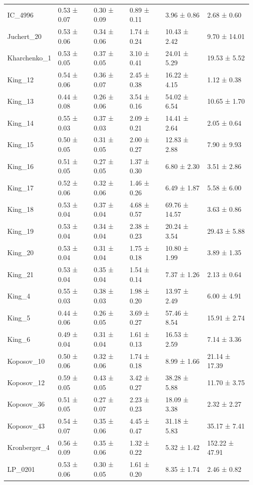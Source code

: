 \begin{tabular}{llllll}
IC_4996 & 0.53 ± 0.07 & 0.30 ± 0.09 & 0.89 ± 0.11 & 3.96 ± 0.86 & 2.68 ± 0.60 \\
Juchert_20 & 0.53 ± 0.06 & 0.34 ± 0.06 & 1.74 ± 0.24 & 10.43 ± 2.42 & 9.70 ± 14.01 \\
Kharchenko_1 & 0.53 ± 0.05 & 0.37 ± 0.05 & 3.10 ± 0.41 & 24.01 ± 5.29 & 19.53 ± 5.52 \\
King_12 & 0.54 ± 0.06 & 0.36 ± 0.07 & 2.45 ± 0.38 & 16.22 ± 4.15 & 1.12 ± 0.38 \\
King_13 & 0.44 ± 0.08 & 0.26 ± 0.06 & 3.54 ± 0.16 & 54.02 ± 6.54 & 10.65 ± 1.70 \\
King_14 & 0.55 ± 0.03 & 0.37 ± 0.03 & 2.09 ± 0.21 & 14.41 ± 2.64 & 2.05 ± 0.64 \\
King_15 & 0.50 ± 0.05 & 0.31 ± 0.05 & 2.00 ± 0.27 & 12.83 ± 2.88 & 7.90 ± 9.93 \\
King_16 & 0.51 ± 0.05 & 0.27 ± 0.05 & 1.37 ± 0.30 & 6.80 ± 2.30 & 3.51 ± 2.86 \\
King_17 & 0.52 ± 0.06 & 0.32 ± 0.06 & 1.46 ± 0.26 & 6.49 ± 1.87 & 5.58 ± 6.00 \\
King_18 & 0.53 ± 0.04 & 0.37 ± 0.04 & 4.68 ± 0.57 & 69.76 ± 14.57 & 3.63 ± 0.86 \\
King_19 & 0.53 ± 0.04 & 0.34 ± 0.04 & 2.38 ± 0.23 & 20.24 ± 3.54 & 29.43 ± 5.88 \\
King_20 & 0.53 ± 0.04 & 0.31 ± 0.04 & 1.75 ± 0.18 & 10.80 ± 1.99 & 3.89 ± 1.35 \\
King_21 & 0.53 ± 0.04 & 0.35 ± 0.04 & 1.54 ± 0.14 & 7.37 ± 1.26 & 2.13 ± 0.64 \\
King_4 & 0.55 ± 0.03 & 0.38 ± 0.03 & 1.98 ± 0.20 & 13.97 ± 2.49 & 6.00 ± 4.91 \\
King_5 & 0.44 ± 0.06 & 0.26 ± 0.05 & 3.69 ± 0.27 & 57.46 ± 8.54 & 15.91 ± 2.74 \\
King_6 & 0.49 ± 0.04 & 0.31 ± 0.04 & 1.61 ± 0.13 & 16.53 ± 2.59 & 7.14 ± 3.36 \\
Koposov_10 & 0.50 ± 0.06 & 0.32 ± 0.06 & 1.74 ± 0.18 & 8.99 ± 1.66 & 21.14 ± 17.39 \\
Koposov_12 & 0.59 ± 0.05 & 0.43 ± 0.05 & 3.42 ± 0.27 & 38.28 ± 5.88 & 11.70 ± 3.75 \\
Koposov_36 & 0.51 ± 0.05 & 0.27 ± 0.07 & 2.23 ± 0.23 & 18.09 ± 3.38 & 2.32 ± 2.27 \\
Koposov_43 & 0.54 ± 0.07 & 0.35 ± 0.06 & 4.45 ± 0.47 & 31.18 ± 5.83 & 35.17 ± 7.41 \\
Kronberger_4 & 0.56 ± 0.09 & 0.35 ± 0.06 & 1.32 ± 0.22 & 5.32 ± 1.42 & 152.22 ± 47.91 \\
LP_0201 & 0.53 ± 0.06 & 0.30 ± 0.05 & 1.61 ± 0.20 & 8.35 ± 1.74 & 2.46 ± 0.82 \\

\end{tabular}
